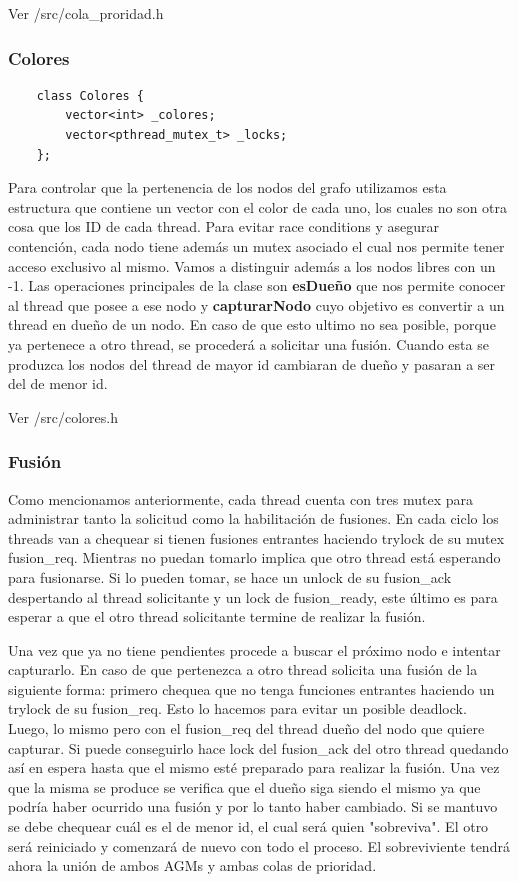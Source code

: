 Ver \textmd{/src/cola_proridad.h}

\subsubsection{Colores}

\begin{verbatim}
    class Colores {
        vector<int> _colores;
        vector<pthread_mutex_t> _locks;
    };
\end{verbatim}

Para controlar que la pertenencia de los nodos del grafo utilizamos esta estructura que contiene un vector con el color de cada uno, los cuales no son otra cosa que los ID de cada thread. Para evitar race conditions y asegurar contención, cada nodo tiene además un mutex asociado el cual nos permite tener acceso exclusivo al mismo. Vamos a distinguir además a los nodos libres con un -1.  Las operaciones principales de la clase son \textbf{esDueño} que nos permite conocer al thread que posee a ese nodo y \textbf{capturarNodo} cuyo objetivo es convertir a un thread en dueño de un nodo. En caso de que esto ultimo no sea posible, porque ya pertenece a otro thread, se procederá a solicitar una fusión. Cuando esta se produzca los nodos del thread de mayor id cambiaran de dueño y pasaran a ser del de menor id.

Ver \textmd{/src/colores.h}

\subsubsection{Fusión}

Como mencionamos anteriormente, cada thread cuenta con tres mutex para administrar tanto la solicitud como la habilitación de fusiones. En cada ciclo los threads van a chequear si tienen fusiones entrantes haciendo trylock de su mutex fusion\_req. Mientras no puedan tomarlo implica que otro thread está esperando para fusionarse. Si lo pueden tomar, se hace un unlock de su fusion\_ack despertando al thread solicitante y un lock de fusion\_ready, este último es para esperar a que el otro thread solicitante termine de realizar la fusión.

Una vez que ya no tiene pendientes procede a buscar el próximo nodo e intentar capturarlo. En caso de que pertenezca a otro thread solicita una fusión de la siguiente forma: primero chequea que no tenga funciones entrantes haciendo un trylock de su fusion\_req. Esto lo hacemos para evitar un posible deadlock. Luego, lo mismo pero con el fusion\_req del thread dueño del nodo que quiere capturar. Si puede conseguirlo hace lock del fusion\_ack del otro thread quedando así en espera hasta que el mismo esté preparado para realizar la fusión. Una vez que la misma se produce se verifica que el dueño siga siendo el mismo ya que podría haber ocurrido una fusión y por lo tanto haber cambiado. Si se mantuvo se debe chequear cuál es el de menor id, el cual será quien "sobreviva". El otro será reiniciado y comenzará de nuevo con todo el proceso. El sobreviviente tendrá ahora la unión de ambos AGMs y ambas colas de prioridad.

